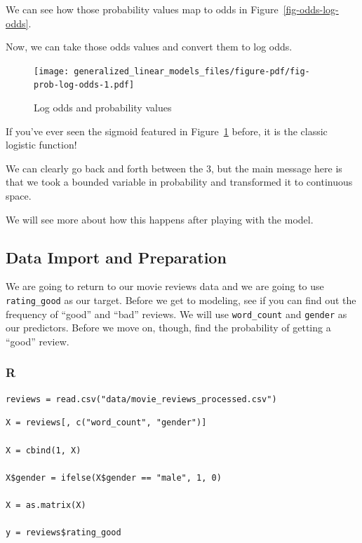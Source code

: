 \documentclass[
  letterpaper,
]{krantz}
\begin{document}
We can see how those probability values map to odds in
Figure~\ref{fig-odds-log-odds}.

Now, we can take those odds values and convert them to log odds.

\begin{figure}

{\centering \texttt{[image: generalized\_linear\_models\_files/figure-pdf/fig-prob-log-odds-1.pdf]}

}

\caption{\label{fig-prob-log-odds}Log odds and probability values}

\end{figure}

If you've ever seen the sigmoid featured in
Figure~\ref{fig-prob-log-odds} before, it is the classic logistic
function!

We can clearly go back and forth between the 3, but the main message
here is that we took a bounded variable in probability and transformed
it to continuous space.

We will see more about how this happens after playing with the model.

\subsection{Data Import and
Preparation}\label{data-import-and-preparation}

We are going to return to our movie reviews data and we are going to use
\texttt{rating\_good} as our target. Before we get to modeling, see if
you can find out the frequency of ``good'' and ``bad'' reviews. We will
use \texttt{word\_count} and \texttt{gender} as our predictors. Before
we move on, though, find the probability of getting a ``good'' review.

\subsubsection{R}

\begin{verbatim}
reviews = read.csv("data/movie_reviews_processed.csv")
\end{verbatim}

\begin{verbatim}
X = reviews[, c("word_count", "gender")]

X = cbind(1, X)

X$gender = ifelse(X$gender == "male", 1, 0)

X = as.matrix(X)

y = reviews$rating_good
\end{verbatim}
\end{document}
